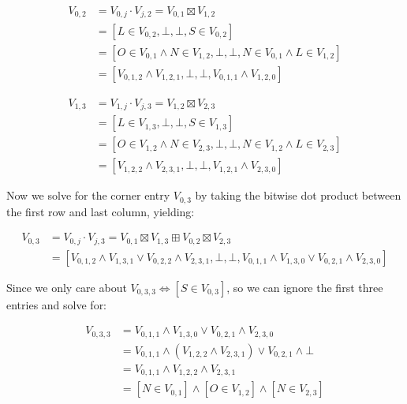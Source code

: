 \documentclass[sigplan,review,anonymous,acmsmall]{acmart}\settopmatter{printfolios=false,printccs=false,printacmref=false}
\begin{document}
  \begin{align}
    V_{0, 2} &= V_{0, j} \cdot V_{j, 2} = V_{0, 1} \boxtimes V_{1, 2}\\
    &= [L \in V_{0, 2}, \bot, \bot, S \in V_{0, 2}]\\
    &= [O \in V_{0, 1} \land N \in V_{1, 2}, \bot, \bot, N \in V_{0, 1} \land L \in V_{1, 2}]\\
    &= [V_{0, 1, 2} \land V_{1, 2, 1}, \bot, \bot, V_{0, 1, 1} \land V_{1, 2, 0}]
  \end{align}

  \begin{align}
    V_{1, 3} &= V_{1, j} \cdot V_{j, 3} = V_{1, 2} \boxtimes V_{2, 3}\\
    &= [L \in V_{1, 3}, \bot, \bot, S \in V_{1, 3}]\\
    &= [O \in V_{1, 2} \land N \in V_{2, 3}, \bot, \bot, N \in V_{1, 2} \land L \in V_{2, 3}]\\
    &= [V_{1, 2, 2} \land V_{2, 3, 1}, \bot, \bot, V_{1, 2, 1} \land V_{2, 3, 0}]
  \end{align}

  Now we solve for the corner entry $V_{0, 3}$ by taking the bitwise dot product between the first row and last column, yielding:

  \begin{align}
    V_{0, 3} &= V_{0, j} \cdot V_{j, 3} = V_{0, 1} \boxtimes V_{1, 3} \boxplus V_{0, 2} \boxtimes V_{2, 3}\\
    &= [V_{0, 1, 2} \land V_{1, 3, 1} \lor V_{0, 2, 2} \land V_{2, 3, 1}, \bot, \bot, V_{0, 1, 1} \land V_{1, 3, 0} \lor V_{0, 2, 1} \land V_{2, 3, 0}]
  \end{align}

  Since we only care about $V_{0, 3, 3} \Leftrightarrow [S \in V_{0, 3}]$, so we can ignore the first three entries and solve for:

  \begin{align}
    V_{0, 3, 3} &= V_{0, 1, 1} \land V_{1, 3, 0} \lor V_{0, 2, 1} \land V_{2, 3, 0}\\
    &= V_{0, 1, 1} \land (V_{1, 2, 2} \land V_{2, 3, 1}) \lor V_{0, 2, 1} \land \bot\\
    &= V_{0, 1, 1} \land V_{1, 2, 2} \land V_{2, 3, 1}\\
    &= [N \in V_{0, 1}] \land [O \in V_{1, 2}] \land [N \in V_{2, 3}]
  \end{align}
\end{document}
